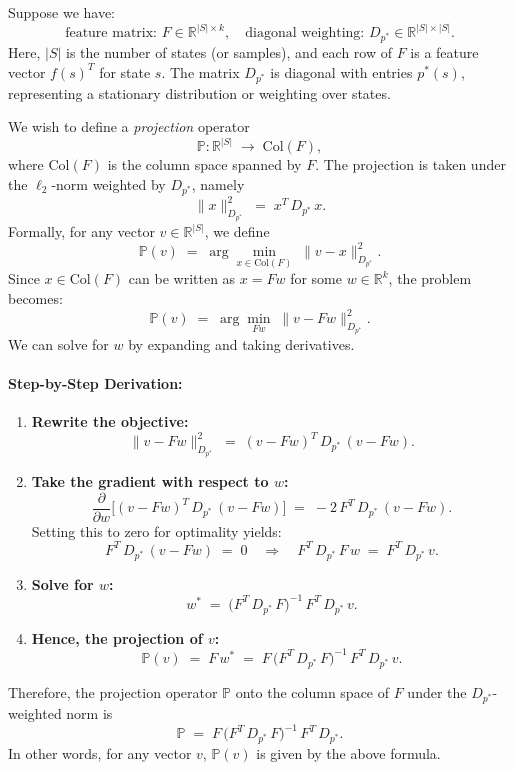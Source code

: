 Suppose we have:
\[
\text{feature matrix: } F \in \mathbb{R}^{|S|\times k}, 
\quad
\text{diagonal weighting: } D_{p^*} \in \mathbb{R}^{|S|\times |S|}.
\]
Here, $|S|$ is the number of states (or samples), and each row of $F$ is a feature vector $f(s)^T$ for state $s$. The matrix $D_{p^*}$ is diagonal with entries $p^*(s)$, representing a stationary distribution or weighting over states.

We wish to define a \emph{projection} operator
\[
\mathbb{P}: \mathbb{R}^{|S|} \;\to\; \text{Col}(F),
\]
where $\text{Col}(F)$ is the column space spanned by $F$. The projection is taken under the $\ell_2$-norm weighted by $D_{p^*}$, namely
\[
\|x\|_{D_{p^*}}^2 \;=\; x^T\,D_{p^*}\,x.
\]
Formally, for any vector $v \in \mathbb{R}^{|S|}$, we define
\[
\mathbb{P}(v) \;=\; \arg\min_{x \in \text{Col}(F)} \;\|v - x\|_{D_{p^*}}^2.
\]
Since $x \in \text{Col}(F)$ can be written as $x = Fw$ for some $w \in \mathbb{R}^k$, the problem becomes:
\[
\mathbb{P}(v) 
\;=\; \arg\min_{Fw} \;\|v - Fw\|_{D_{p^*}}^2.
\]
We can solve for $w$ by expanding and taking derivatives.

\paragraph{Step-by-Step Derivation:}

\begin{enumerate}
    \item \textbf{Rewrite the objective:}
    \[
    \|v - Fw\|_{D_{p^*}}^2 
    \;=\; (v - Fw)^T\,D_{p^*}\,(v - Fw).
    \]
    
    \item \textbf{Take the gradient with respect to $w$:}
    \[
    \frac{\partial}{\partial w} 
    \bigl[(v - Fw)^T\,D_{p^*}\,(v - Fw)\bigr]
    \;=\;
    -2\,F^T\,D_{p^*}\,(v - Fw).
    \]
    Setting this to zero for optimality yields:
    \[
    F^T\,D_{p^*}\,(v - Fw) \;=\; 0 
    \quad\Longrightarrow\quad
    F^T\,D_{p^*}\,F\,w \;=\; F^T\,D_{p^*}\,v.
    \]
    
    \item \textbf{Solve for $w$:}
    \[
    w^* 
    \;=\; \bigl(F^T\,D_{p^*}\,F\bigr)^{-1}\,F^T\,D_{p^*}\,v.
    \]
    
    \item \textbf{Hence, the projection of $v$:}
    \[
    \mathbb{P}(v)
    \;=\; F\,w^*
    \;=\; F\,\bigl(F^T\,D_{p^*}\,F\bigr)^{-1}\,F^T\,D_{p^*}\,v.
    \]
\end{enumerate}

Therefore, the projection operator $\mathbb{P}$ onto the column space of $F$ under the $D_{p^*}$-weighted norm is
\[
\boxed{
\mathbb{P} 
\;=\; 
F\,\bigl(F^T\,D_{p^*}\,F\bigr)^{-1}\,F^T\,D_{p^*}.
}
\]
In other words, for any vector $v$, $\mathbb{P}(v)$ is given by the above formula.

